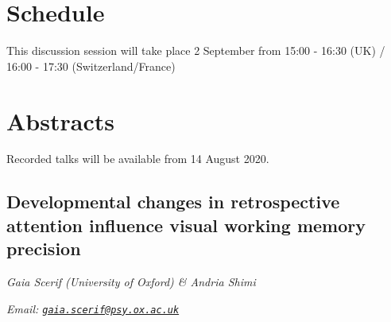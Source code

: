\documentclass[
  12pt,
]{book}
\begin{document}
\hypertarget{schedule-3}{%
\section{Schedule}\label{schedule-3}}

This discussion session will take place 2 September from 15:00 - 16:30 (UK) / 16:00 - 17:30 (Switzerland/France)

\hypertarget{abstracts-3}{%
\section{Abstracts}\label{abstracts-3}}

Recorded talks will be available from 14 August 2020.

\hypertarget{developmental-changes-in-retrospective-attention-influence-visual-working-memory-precision}{%
\subsection{Developmental changes in retrospective attention influence visual working memory precision}\label{developmental-changes-in-retrospective-attention-influence-visual-working-memory-precision}}

\emph{Gaia Scerif (University of Oxford) \& Andria Shimi}

\emph{Email: \href{mailto:gaia.scerif@psy.ox.ac.uk}{\nolinkurl{gaia.scerif@psy.ox.ac.uk}}}
\end{document}
